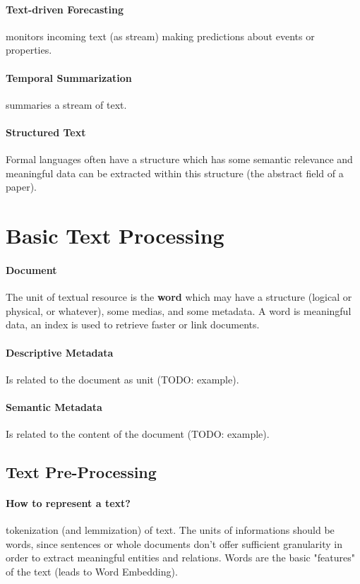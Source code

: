 \paragraph{Text-driven Forecasting} monitors incoming text (as stream) making predictions about events or properties.

\paragraph{Temporal Summarization} summaries a stream of text.

\paragraph{Structured Text} Formal languages often have a structure which has some semantic relevance and meaningful data can be extracted within this structure (the abstract field of a paper).

\section{Basic Text Processing}

\paragraph{Document} The unit of textual resource is the \textbf{word} which may have a structure (logical or physical, or whatever), some medias, and some metadata.
A word is meaningful data, an index is used to retrieve faster or link documents.

\paragraph{Descriptive Metadata} Is related to the document as unit (TODO: example).

\paragraph{Semantic Metadata} Is related to the content of the document (TODO: example).

\subsection{Text Pre-Processing}

\paragraph{How to represent a text?} tokenization (and lemmization) of text. The units of informations should be words, since sentences or whole documents don't offer sufficient granularity in order to extract meaningful entities and relations. Words are the basic "features" of the text (leads to Word Embedding).


